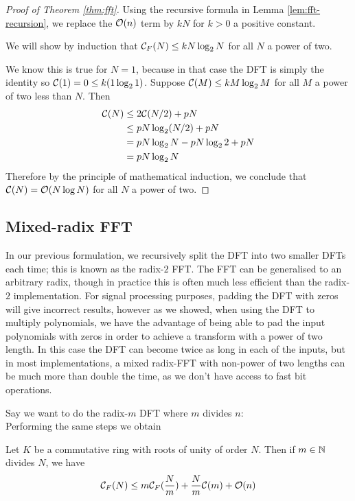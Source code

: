 
\begin{proof}[Proof of Theorem \ref{thm:fft}]
    Using the recursive formula in Lemma \ref{lem:fft-recursion}, we replace the $\mathcal O(n)$ term by $kN$ for $k> 0$ a positive constant.

    We will show by induction that $\mathcal C_F(N) \le kN\log_2 N$ for all $N$ a power of two.

    We know this is true for $N = 1$, because in that case the DFT is simply the identity so $\mathcal C(1) = 0 \le k(1 \log_2 1)$.
    Suppose $\mathcal C(M) \le kM\log_2 M$ for all $M$ a power of two less than $N$. Then
    \begin{align*}
        \mathcal C(N)
        &\le 2\mathcal C(N/2) + pN\\
        &\le pN\log_2 (N/2) + pN\\
        &= pN\log_2 N - pN\log_2 2 + pN\\
        &= pN\log_2 N
    \end{align*}
    Therefore by the principle of mathematical induction, we conclude that $\mathcal C(N) = \mathcal O(N \log N)$ for all $N$ a power of two.
\end{proof}


\subsection{Mixed-radix FFT}

In our previous formulation, we recursively split the DFT into two smaller DFTs each time; this is known as the radix-$2$ FFT. The FFT can be generalised to an arbitrary radix, though in practice this is often much less efficient than the radix-$2$ implementation. For signal processing purposes, padding the DFT with zeros will give incorrect results, however as we showed, when using the DFT to multiply polynomials, we have the advantage of being able to pad the input polynomials with zeros in order to achieve a transform with a power of two length. In this case the DFT can become twice as long in each of the inputs, but in most implementations, a mixed radix-FFT with non-power of two lengths can be much more than double the time, as we don't have access to fast bit operations.

Say we want to do the radix-$m$ DFT where $m$ divides $n$:\\
Performing the same steps we obtain

\begin{theorem}\label{thm:mixed-radix-fft}
    Let $K$ be a commutative ring with roots of unity of order $N$. Then if $m \in {\mathbb N}$ divides $N$, we have
    \[
        \mathcal C_F(N) \le m\mathcal C_F(\frac{N}{m}) + \frac{N}{m}\mathcal C(m) + \mathcal O(n)
    \]
\end{theorem}

